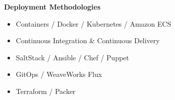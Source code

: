 \textbf{Deployment Methodologies}
\begin{itemize}
    \item Containers / Docker / Kubernetes / Amazon ECS
    \item Continuous Integration \& Continuous Delivery
    \item SaltStack / Ansible / Chef / Puppet
    \item GitOps / WeaveWorks Flux
    \item Terraform / Packer
\end{itemize}